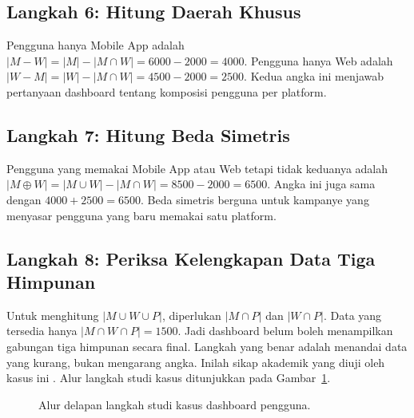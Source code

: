 \documentclass[11pt,a4paper]{article}
\begin{document}
\subsection{Langkah 6: Hitung Daerah Khusus}

Pengguna hanya Mobile App adalah $|M-W|=|M|-|M \cap W|=6000-2000=4000$. Pengguna hanya Web adalah $|W-M|=|W|-|M \cap W|=4500-2000=2500$. Kedua angka ini menjawab pertanyaan dashboard tentang komposisi pengguna per platform.

\subsection{Langkah 7: Hitung Beda Simetris}

Pengguna yang memakai Mobile App atau Web tetapi tidak keduanya adalah $|M \oplus W|=|M \cup W|-|M \cap W|=8500-2000=6500$. Angka ini juga sama dengan $4000+2500=6500$. Beda simetris berguna untuk kampanye yang menyasar pengguna yang baru memakai satu platform.

\subsection{Langkah 8: Periksa Kelengkapan Data Tiga Himpunan}

Untuk menghitung $|M \cup W \cup P|$, diperlukan $|M \cap P|$ dan $|W \cap P|$. Data yang tersedia hanya $|M \cap W \cap P|=1500$. Jadi dashboard belum boleh menampilkan gabungan tiga himpunan secara final. Langkah yang benar adalah menandai data yang kurang, bukan mengarang angka. Inilah sikap akademik yang diuji oleh kasus ini \cite{silberschatz}. Alur langkah studi kasus ditunjukkan pada Gambar~\ref{fig:alur-studi-kasus}.

\begin{figure}[H]
	\centering
	\caption{Alur delapan langkah studi kasus dashboard pengguna.}
	\label{fig:alur-studi-kasus}
\end{figure}
\end{document}
